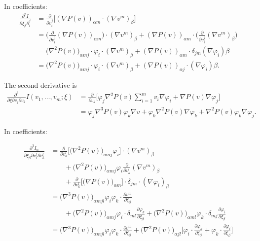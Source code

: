 \documentclass[a4paper]{article}
\begin{document}
In coefficients:
\begin{align*}
 \frac{\partial^2 I}{\partial \xi_\beta \partial_i^j}
 & =
 \frac{\partial}{\partial v_i^j} \Big[ (\nabla P(v))_{\alpha m} \cdot (\nabla v^m)_\beta \Big]
 \\
 & =
 \Big( \frac{\partial}{\partial v_i^j} (\nabla P(v))_{\alpha m} \Big) \cdot (\nabla v^m)_\beta
 +
 (\nabla P(v))_{\alpha m} \cdot \Big( \frac{\partial}{\partial v_i^j} (\nabla v^m)_\beta \Big)
 \\
 & =
 \big( \nabla^2 P(v) \big)_{\alpha m j} \cdot \varphi_i \cdot ( \nabla v^m)_\beta
 +
 (\nabla P(v))_{\alpha m} \cdot \delta_{jm} (\nabla \varphi_i)\beta
 \\
 & =
 \big( \nabla^2 P(v) \big)_{\alpha m j} \cdot \varphi_i \cdot ( \nabla v^m)_\beta
 +
 (\nabla P(v))_{\alpha j} \cdot (\nabla \varphi_i)\beta.
\end{align*}


The second derivative is
\begin{align*}
 \frac{\partial^3}{\partial \xi \partial v_j \partial v_k} I(v_1,\dots,v_m;\xi)
 & =
 \frac{\partial}{\partial v_k} \Big[ \varphi_j \nabla^2P(v) \sum_{i=1}^m v_i \nabla \varphi_i + \nabla P(v) \nabla \varphi_j \Big] \\
 & =
 \varphi_j \nabla^3 P(v) \varphi_k \nabla v + \varphi_k \nabla^2 P(v) \nabla \varphi_k + \nabla^2P(v) \varphi_k \nabla \varphi_j.
\end{align*}

In coefficients:

\begin{align*}
 \frac{\partial^3 I_\alpha}{\partial \xi_\beta \partial v_i^j \partial v_k^l}
 & =
 \frac{\partial}{\partial v_k^l} \Big[ \big(\nabla^2 P(v)\big)_{amj} \varphi_i \Big] \cdot (\nabla v^m)_\beta
 \\
 & \qquad
 + \big(\nabla^2 P(v)\big)_{\alpha m j} \varphi_i \frac{\partial}{\partial v_k^l} (\nabla v^m)_\beta
 \\
 & \qquad
 + \frac{\partial}{\partial v_k^l} \Big[ \big(\nabla P(v)\big)_{\alpha m} \Big]
  \cdot \delta_{jm} \cdot (\nabla \varphi_i)_\beta
 \\
 & =
 \big(\nabla^3 P(v) \big)_{\alpha m j l} \varphi_i \varphi_k \cdot \frac{\partial v^m}{\partial \xi_\beta}
 \\
 & \qquad
 + \big(\nabla^2 P(v) \big)_{\alpha m j} \varphi_i \cdot \delta_{ml} \frac{\partial \varphi_k}{\partial \xi_\beta}
 + \big(\nabla^2 P(v) \big)_{\alpha m l} \varphi_k \cdot \delta_{mj} \frac{\partial \varphi_i}{\partial \xi_\beta}
 \\
 & =
 \big(\nabla^3 P(v) \big)_{\alpha m j l} \varphi_i \varphi_k \cdot \frac{\partial v^m}{\partial \xi_\beta}
 + \big(\nabla^2 P(v) \big)_{\alpha j l}
 \Big [\varphi_i \cdot \frac{\partial \varphi_k}{\partial \xi_\beta}
 + \varphi_k \cdot \frac{\partial \varphi_i}{\partial \xi_\beta} \Big]
\end{align*}




\printbibliography
\end{document}
